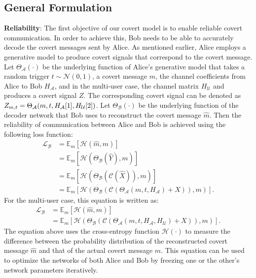 \subsection{General Formulation}
\textbf{Reliability}: The first objective of our covert model is to enable reliable covert communication. In order to achieve this, Bob needs to be able to accurately decode the covert messages sent by Alice. As mentioned earlier, Alice employs a generative model to produce covert signals that correspond to the covert message. Let \(\Theta_{\mathcal{A}}(\cdot)\) be the underlying function of Alice's generative model that takes a random trigger \(t \sim \mathcal{N}(0, 1)\), a covert message \(m\), the channel coefficients from Alice to Bob \(H_{\mathcal{A}}\), and in the multi-user case, the channel matrix \(H_{\mathcal{U}}\) and produces a covert signal \(Z\). The corresponding covert signal can be denoted as \(Z_{m, t} = \Theta_{\mathcal{A}}(m, t, H_{\mathcal{A}}[1], H_{\mathcal{U}}[2])\). Let  \(\Theta_{\mathcal{B}}(\cdot)\) be the underlying function of the decoder network that Bob uses to reconstruct the covert message \(\hat{m}\). Then the reliability of communication between Alice and Bob is achieved using the following loss function:
\begin{equation}
	\begin{aligned} \label{bob_loss}
	\mathcal{L}_{\mathcal{B}} & = \mathbb{E}_{m}[\mathcal{H}(\hat{m}, m)] \\
	& = \mathbb{E}_{m}[\mathcal{H}(\Theta_{\mathcal{B}}(\hat{Y}), m)] \\ 
	& = \mathbb{E}_{m}[\mathcal{H}(\Theta_{\mathcal{B}}(\mathcal{C}(\hat{X})), m)] \\ 
	& = \mathbb{E}_{m}[\mathcal{H}(\Theta_{\mathcal{B}}(\mathcal{C}(\Theta_{\mathcal{A}}(m, t, H_{\mathcal{A}}) + X)), m)].
	\end{aligned}
\end{equation}
For the multi-user case, this equation is written as:
\begin{equation}
	\begin{aligned}
		\mathcal{L}_{\mathcal{B}} & = \mathbb{E}_{m}[\mathcal{H}(\hat{m}, m)] \\
		& = \mathbb{E}_{m}[\mathcal{H}(\Theta_{\mathcal{B}}(\mathcal{C}(\Theta_{\mathcal{A}}(m, t, H_{\mathcal{A}}, H_{\mathcal{U}}) + X)), m)].
	\end{aligned}
\end{equation}
The equation above uses the cross-entropy function \(\mathcal{H}(\cdot)\) to measure the difference between the probability distribution of the reconstructed covert message \(\hat{m}\) and that of the actual covert message \(m\). This equation can be used to optimize the networks of both Alice and Bob by freezing one or the other's network parameters iteratively.


